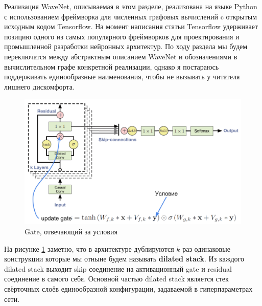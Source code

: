 \documentclass[../diploma.tex]{subfiles}
\begin{document}



Реализация WaveNet, описываемая в этом разделе, реализована на языке Python с использованием фреймворка для численных графовых вычислений c открытым исходным кодом Tensorflow. На момент написания статьи Tensorflow удерживает позицию одного из самых популярного фреймворков для проектирования и промышленной разработки нейронных архитектур.
По ходу раздела мы будем переключатся между абстрактным описанием WaveNet и обозначениями в вычислительном графе конкретной реализации, однако я постараюсь поддерживать единообразные наименования, чтобы не вызывать у читателя лишнего дискомфорта.

\begin{figure}[!htbp]
  \centering
  \includegraphics[scale=0.35]{img/wavenet_arrow}
  \caption{Gate, отвечающий за условия}
  \label{fig:wavenet_arrow}
\end{figure}

На рисунке \ref{fig:wavenet_arrow} заметно, что в архитектуре дублируются $k$ раз одинаковые конструкции которые мы отныне будем называть \textbf{dilated stack}. Из каждого dilated stack выходит skip соединение на активационный gate и residual соединение в самого себя. Основной частью dilated stack является стек свёрточных слоёв единообразной конфигурации, задаваемой в гиперпараметрах сети.
\end{document}
